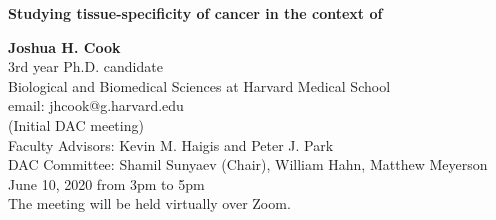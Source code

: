 \begin{titlepage}
    \begin{center}
        \vspace*{2cm}
        \LARGE
        \vspace{3cm}
        \textbf{Studying tissue-specificity of cancer in the context of \KRAS{}}

        \vfill
 
        \Large
        \textbf{Joshua H. Cook} \\
        \vspace{1cm}
        3rd year Ph.D. candidate \\
        Biological and Biomedical Sciences at Harvard Medical School \\
        email: jhcook@g.harvard.edu \\
        (Initial DAC meeting) \\
        Faculty Advisors: Kevin M. Haigis and Peter J. Park \\
        DAC Committee: Shamil Sunyaev (Chair), William Hahn, Matthew Meyerson \\
        June 10, 2020 from 3pm to 5pm \\
        The meeting will be held virtually over Zoom.\\
        \vspace{2cm}
 
    \end{center}
\end{titlepage}
